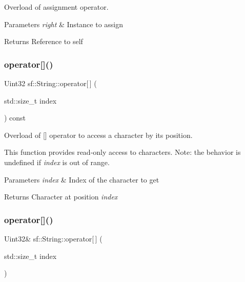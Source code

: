 Overload of assignment operator. 


\begin{DoxyParams}{Parameters}
{\em right} & Instance to assign\\
\hline
\end{DoxyParams}
\begin{DoxyReturn}{Returns}
Reference to self 
\end{DoxyReturn}
\mbox{\label{classsf_1_1_string_a035c1b585a0ebed81e773ecafed57926}} 
\subsubsection{\texorpdfstring{operator[]()}{operator[]()}\hspace{0.1cm}{\footnotesize\ttfamily [1/2]}}
{\footnotesize\ttfamily Uint32 sf\+::\+String\+::operator\mbox{[}$\,$\mbox{]} (\begin{DoxyParamCaption}\item[{std\+::size\+\_\+t}]{index }\end{DoxyParamCaption}) const}



Overload of \mbox{[}\mbox{]} operator to access a character by its position. 

This function provides read-\/only access to characters. Note\+: the behavior is undefined if {\itshape index} is out of range.


\begin{DoxyParams}{Parameters}
{\em index} & Index of the character to get\\
\hline
\end{DoxyParams}
\begin{DoxyReturn}{Returns}
Character at position {\itshape index} 
\end{DoxyReturn}
\mbox{\label{classsf_1_1_string_abc989da7f4fb873ab29188d40772ab24}} 
\subsubsection{\texorpdfstring{operator[]()}{operator[]()}\hspace{0.1cm}{\footnotesize\ttfamily [2/2]}}
{\footnotesize\ttfamily Uint32\& sf\+::\+String\+::operator\mbox{[}$\,$\mbox{]} (\begin{DoxyParamCaption}\item[{std\+::size\+\_\+t}]{index }\end{DoxyParamCaption})}



